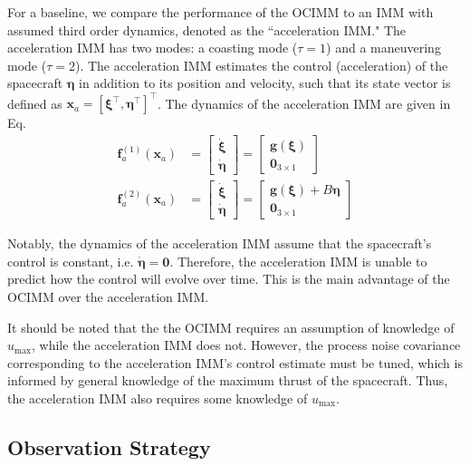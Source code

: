 \documentclass[letterpaper, preprint, paper,11pt]{AAS}	%
\begin{document}
For a baseline, we compare the performance of the OCIMM to an IMM with assumed third order dynamics, denoted as the ``acceleration IMM." The acceleration IMM has two modes: a coasting mode ($\tau = 1$) and a maneuvering mode ($\tau = 2$). The acceleration IMM estimates the control (acceleration) of the spacecraft $\bm{\eta}$ in addition to its position and velocity, such that its state vector is defined as $\bm{x}_a = [\bm{\xi}^\top, \bm{\eta}^\top]^\top$. The dynamics of the acceleration IMM are given in Eq. 
\begin{align}
    \bm{f}^{(1)}_a (\bm{x}_a) &= \begin{bmatrix}
        \dot{\bm{\xi}} \\
        \dot{\bm{\eta}}
    \end{bmatrix} = \begin{bmatrix}
        \bm{g}(\bm{\xi}) \\
        \bm{0}_{3 \times 1}
    \end{bmatrix} \label{eq:accel-IMM-coasting-dynamics} \\
    \bm{f}^{(2)}_a (\bm{x}_a) &= \begin{bmatrix}
        \dot{\bm{\xi}} \\
        \dot{\bm{\eta}}
    \end{bmatrix} = \begin{bmatrix}
        \bm{g}(\bm{\xi}) + B \bm{\eta} \\
        \bm{0}_{3 \times 1}
    \end{bmatrix} \label{eq:accel-IMM-thrusting-dynamics}
\end{align}

Notably, the dynamics of the acceleration IMM assume that the spacecraft's control is constant, i.e. $\dot{\bm{\eta}} = \bm{0}$. Therefore, the acceleration IMM is unable to predict how the control will evolve over time. This is the main advantage of the OCIMM over the acceleration IMM.

It should be noted that the the OCIMM requires an assumption of knowledge of $u_\text{max}$, while the acceleration IMM does not. However, the process noise covariance corresponding to the acceleration IMM's control estimate must be tuned, which is informed by general knowledge of the maximum thrust of the spacecraft. Thus, the acceleration IMM also requires some knowledge of $u_\text{max}$. 

\subsection{Observation Strategy}
\end{document}
